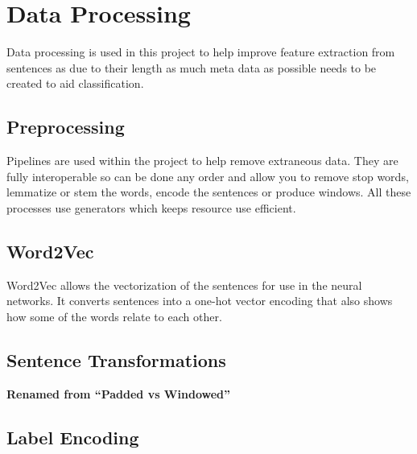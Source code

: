 \section{Data Processing}
\label{sec:data_processing}

Data processing is used in this project to help improve feature extraction from sentences as due to their length as much meta data as possible needs to be created to aid classification.

  \subsection{Preprocessing}
  \label{sec:preprocessing}
    Pipelines are used within the project to help remove extraneous data. They are fully interoperable so can be done any order and allow you to remove stop words, lemmatize or stem the words, encode the sentences or produce windows. All these processes use generators which keeps resource use efficient.

  \subsection{Word2Vec}
  \label{sec:word2vec}
 	Word2Vec allows the vectorization of the sentences for use in the neural networks. It converts sentences into a one-hot vector encoding that also shows how some of the words relate to each other. 

  \subsection{Sentence Transformations}
  \label{sec:sentence_transformations}
    \textbf{Renamed from ``Padded vs Windowed''}

  \subsection{Label Encoding}
  \label{sec:label_encoding}
  